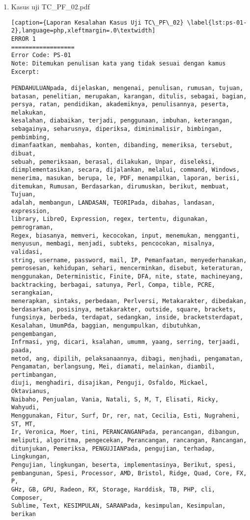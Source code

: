 \begin{enumerate}
	\item Kasus uji TC\_PF\_02.pdf

\begin{lstlisting}[caption={Laporan Kesalahan Kasus Uji TC\_PF\_02}	\label{lst:ps-01-2},language=php,xleftmargin=.0\textwidth]
ERROR 1
==================
Error Code: PS-01
Note: Ditemukan penulisan kata yang tidak sesuai dengan kamus
Excerpt: 

PENDAHULUANpada, dijelaskan, mengenai, penulisan, rumusan, tujuan, 
batasan, penelitian, merupakan, karangan, ditulis, sebagai, bagian, 
persya, ratan, pendidikan, akademiknya, penulisannya, peserta, melakukan, 
kesalahan, diabaikan, terjadi, penggunaan, imbuhan, keterangan, 
sebagainya, seharusnya, diperiksa, diminimalisir, bimbingan, pembimbing, 
dimanfaatkan, membahas, konten, dibanding, memeriksa, tersebut, dibuat, 
sebuah, pemeriksaan, berasal, dilakukan, Unpar, diseleksi, 
diimplementasikan, secara, dijalankan, melalui, command, Windows, 
menerima, masukan, berupa, le, PDF, menampilkan, laporan, berisi, 
ditemukan, Rumusan, Berdasarkan, dirumuskan, berikut, membuat, Tujuan, 
adalah, membangun, LANDASAN, TEORIPada, dibahas, landasan, expression, 
library, LibreO, Expression, regex, tertentu, digunakan, pemrograman, 
Regex, biasanya, memveri, kecocokan, input, menemukan, mengganti, 
menyusun, membagi, menjadi, subteks, pencocokan, misalnya, validasi, 
string, username, password, mail, IP, Pemanfaatan, menyederhanakan, 
pemrosesan, kehidupan, sehari, mencerminkan, disebut, keteraturan, 
menggunakan, Deterministic, Finite, DFA, nite, state, machineyang, 
backtracking, berbagai, satunya, Perl, Compa, tible, PCRE, serangkaian, 
menerapkan, sintaks, perbedaan, Perlversi, Metakarakter, dibedakan, 
berdasarkan, posisinya, metakarakter, outside, square, brackets, 
fungsinya, berbeda, terdapat, sedangkan, inside, bracketsterdapat, 
Kesalahan, UmumPda, baggian, mengumpulkan, dibutuhkan, pengembangan, 
Infrmasi, yng, dicari, ksalahan, umumm, yaang, serring, terjaadi, paada, 
metod, ang, dipilih, pelaksanaannya, dibagi, menjhadi, pengamatan, 
Pengamatan, berlangsung, Mei, diamati, melainkan, diambil, pertimbangan, 
diuji, menghadiri, disajikan, Penguji, Osfaldo, Mickael, Oktavianus, 
Naibaho, Penjualan, Vania, Natali, S, M, T, Elisati, Ricky, Wahyudi, 
Menggunakan, Fitur, Surf, Dr, rer, nat, Cecilia, Esti, Nugraheni, ST, MT, 
Ir, Veronica, Moer, tini, PERANCANGANPada, perancangan, dibangun, 
meliputi, algoritma, pengecekan, Perancangan, rancangan, Rancangan, 
ditunjukan, Pemeriksa, PENGUJIANPada, pengujian, terhadap, Lingkungan, 
Pengujian, lingkungan, beserta, implementasinya, Berikut, spesi, 
pembangunan, Spesi, Processor, AMD, Bristol, Ridge, Quad, Core, FX, P, 
GHz, GB, GPU, Radeon, RX, Storage, Harddisk, TB, PHP, cli, Composer, 
Sublime, Text, KESIMPULAN, SARANPada, kesimpulan, Kesimpulan, berikan
\end{lstlisting}
\end{enumerate}

